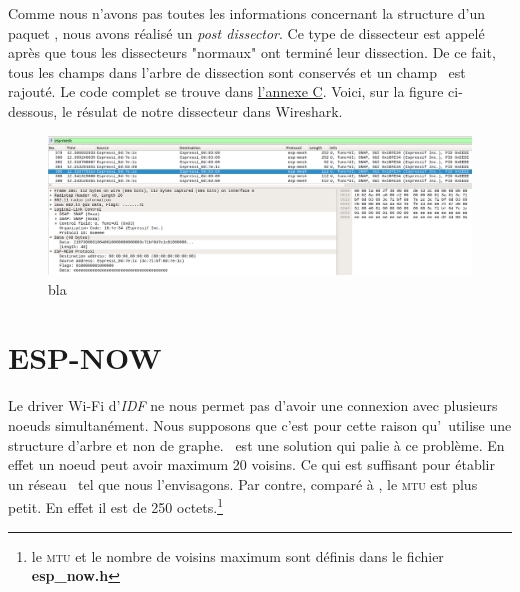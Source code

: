         Comme nous n'avons pas toutes les informations concernant la structure d'un paquet \espmesh, nous avons réalisé
        un \textit{post dissector}. Ce type de dissecteur est appelé après que tous les dissecteurs "normaux" ont terminé
        leur dissection. De ce fait, tous les champs dans l'arbre de dissection sont conservés et un champ \espmesh\ est rajouté.
        Le code complet se trouve dans \hyperref[annexeC]{l'annexe C}.
        Voici, sur la figure ci-dessous, le résulat de notre dissecteur dans Wireshark.
        \begin{figure}[H]
            \centering
            \hspace*{-1.25in}
            \includegraphics[scale=0.35]{images/wireSharkDissector.png}
            \caption{bla}
            \label{result_wiresharkDissector}
        \end{figure}
        

    \section{ESP-NOW}
        Le driver Wi-Fi d'\textit{IDF} ne nous permet pas d'avoir une connexion avec plusieurs noeuds simultanément. 
        Nous supposons que c'est pour cette raison qu'\espmesh\ utilise une structure d'arbre et non de graphe.
        \espnow\ est une solution qui palie à ce problème.
        En effet un noeud peut avoir maximum 20 voisins. Ce qui est suffisant pour établir un réseau \mesh\ tel
        que nous l'envisagons. Par contre, comparé à \espmesh, le \textsc{mtu} est plus petit. En effet il est
        de 250 octets.\footnote{le \textsc{mtu} et le nombre de voisins maximum sont définis dans le fichier
        \textbf{esp\_now.h}}

